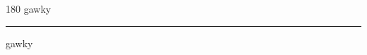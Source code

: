 
\begin{frame}
\begin{center}
\begin{turn}{180}
{\fontsize{2.5cm}{1em}\selectfont gawky}
\end{turn}
\vspace{1em}\par  
\hrule
\vspace{1em}\par  
{\fontsize{2.5cm}{1em}\selectfont gawky}
\end{center}
\end{frame}
